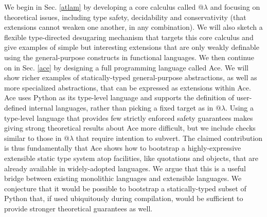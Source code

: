 We begin in Sec. \ref{atlam} by developing a core calculus called @$\lambda$ and focusing on theoretical issues, including type safety, decidability and {conservativity} (that extensions cannot weaken one another, in any combination). We will also sketch a flexible type-directed desugaring mechanism that targets this core calculus and give examples of simple but interesting extensions that are only weakly definable using the general-purpose constructs in functional languages. We then continue on in Sec. \ref{ace} by designing a full programming language called Ace. We will show richer examples of statically-typed general-purpose abstractions, as well as more specialized abstractions, that can be expressed as extensions within Ace. Ace  uses Python as its type-level language and supports the definition of user-defined internal languages, rather than picking a fixed target as in @$\lambda$.  Using a type-level language that provides few strictly enforced safety guarantees makes giving strong theoretical results about Ace more difficult, but we include checks similar to those in @$\lambda$ that require intention to subvert. The claimed contribution is thus fundamentally that Ace shows how to {bootstrap} a highly-expressive extensible static type system atop facilities, like quotations and objects, that are already available in widely-adopted languages. We argue that this is a useful bridge between existing monolithic languages and extensible languages. We conjecture that it would be possible to bootstrap a statically-typed subset of Python that, if used ubiquitously during compilation, would be sufficient to provide stronger theoretical guarantees as well.


